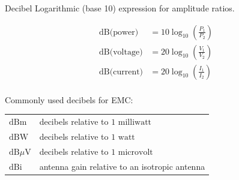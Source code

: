 \documentclass[
]{book}
\begin{document}
Decibel Logarithmic (base 10) expression for amplitude ratios.

\[
\begin{align}
\text{dB(power)} &= 10 \log_10 \left( \frac{P_1}{P_2} \right) \\
\text{dB(voltage)} &= 20 \log_10 \left( \frac{V_1}{V_2} \right) \\
\text{dB(current)} &= 20 \log_10 \left( \frac{I_1}{I_2} \right) \\
\end{align}
\]

Commonly used decibels for EMC:

\begin{longtable}[]{@{}ll@{}}
\toprule
\endhead
\(\text{dBm}\) & decibels relative to \(1 \text{ milliwatt}\)\tabularnewline
\(\text{dBW}\) & decibels relative to \(1 \text{ watt}\)\tabularnewline
\(\text{dB}\mu\text{V}\) & decibels relative to \(1 \text{ microvolt}\)\tabularnewline
\(\text{dBi}\) & antenna gain relative to an isotropic antenna\tabularnewline
\bottomrule
\end{longtable}
\end{document}
